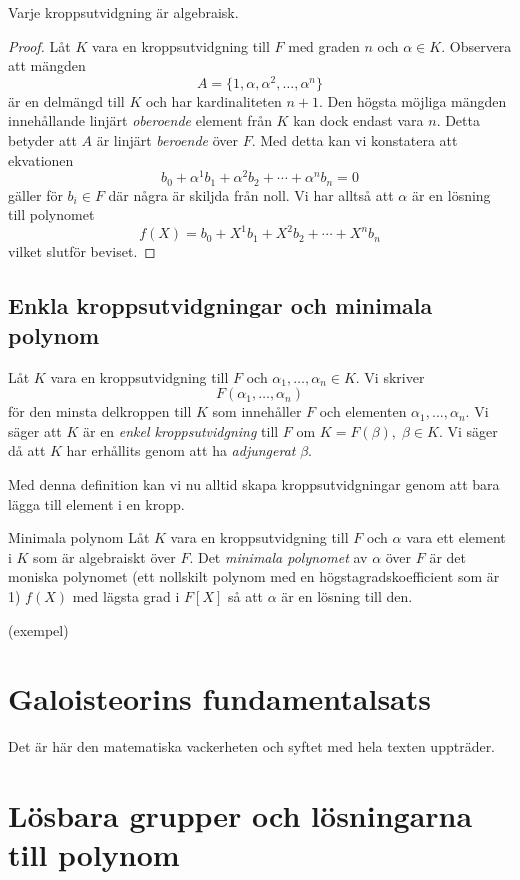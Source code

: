 \documentclass{article}
\theoremstyle{definition}
\begin{document}
\begin{mylemma}{}{}
  Varje kroppsutvidgning är algebraisk.
\end{mylemma}

\begin{proof}
  Låt $K$ vara en kroppsutvidgning till $F$ med graden $n$ och $\alpha \in K$. Observera att mängden
  \[A = \{1, \alpha, \alpha^2, \ldots, \alpha^n\} \]
  är en delmängd till $K$ och har kardinaliteten $n+1$. Den högsta möjliga mängden innehållande linjärt \textit{oberoende} element från $K$ kan dock endast vara $n$. 
  Detta betyder att $A$ är linjärt \textit{beroende} över $F$. Med detta kan vi konstatera att ekvationen
  \[b_0 + \alpha^1 b_1 + \alpha^2 b_2 + \cdots + \alpha^n b_n = 0\]
  gäller för $b_i \in F$ där några är skiljda från noll. Vi har alltså att $\alpha$ är en lösning till polynomet 
  \[f(X) = b_0 + X^1 b_1 + X^2 b_2 + \cdots + X^n b_n\]
  vilket slutför beviset.
\end{proof}

\subsection{Enkla kroppsutvidgningar och minimala polynom}
\begin{mydef}{}{}
  Låt $K$ vara en kroppsutvidgning till $F$ och $\alpha_1, \ldots, \alpha_n \in K$. Vi skriver  
  \[F(\alpha_1, \ldots, \alpha_n)\]
  för den minsta delkroppen till $K$ som innehåller $F$ och elementen $\alpha_1, \ldots, \alpha_n$. Vi säger att $K$ är en \textit{enkel kroppsutvidgning} till $F$
  om $K = F(\beta), \; \beta \in K.$ Vi säger då att $K$ har erhållits genom att ha \textit{adjungerat} $\beta$.
\end{mydef}
Med denna definition kan vi nu alltid skapa kroppsutvidgningar genom att bara lägga till element i en kropp. 

\begin{mydef}{Minimala polynom}{}
  Låt $K$ vara en kroppsutvidgning till $F$ och $\alpha$ vara ett element i $K$ som är algebraiskt över $F$. Det \textit{minimala polynomet} av $\alpha$ över $F$
  är det moniska polynomet (ett nollskilt polynom med en högstagradskoefficient som är 1) $f(X)$ med lägsta grad i $F[X]$ så att $\alpha$ är en lösning till den. 
\end{mydef}
(exempel)
\section{Galoisteorins fundamentalsats}
Det är här den matematiska vackerheten och syftet med hela texten uppträder.
\section{Lösbara grupper och lösningarna till polynom}
\end{document}
